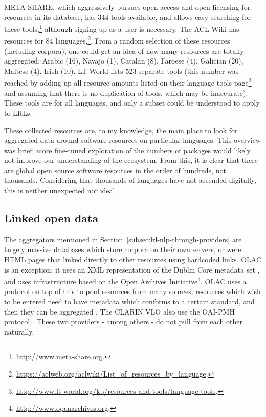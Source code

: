 META-SHARE, which aggressively pursues open access and open licensing for resources in its database, has 344 tools available, and allows easy searching for these tools,\footnote{\href{http://www.meta-share.org/}{http://www.meta-share.org}. } although signing up as a user is necessary. The ACL Wiki has resources for 84 languages,\footnote{\href{https://aclweb.org/aclwiki/List_of_resources_by_language}{https://aclweb.org/aclwiki/List\_of\_resources\_by\_language}. }. From a random selection of these resources (including corpora), one could get an idea of how many resources are totally aggregated: Arabic (16), Navajo (1), Catalan (8), Faroese (4), Galician (20), Maltese (4), Irish (10). LT-World lists 523 separate tools (this number was reached by adding up all resource amounts listed on their language tools page\footnote{\href{http://www.lt-world.org/kb/resources-and-tools/language-tools/}{http://www.lt-world.org/kb/resources-and-tools/language-tools}. } and assuming that there is no duplication of tools, which may be inaccurate). These tools are for all languages, and only a subset could be understood to apply to LRLs.

These collected resources are, to my knowledge, the main place to look for aggregated data around software resources on particular languages. This overview was brief; more fine-tuned exploration of the numbers of packages would likely not improve our understanding of the ecosystem. From this, it is clear that there are global open source software resources in the order of hundreds, not thousands. Considering that thousands of languages have not ascended digitally, this is neither unexpected nor ideal.

\subsection{Linked open data}
\label{subsec:lod}

The aggregators mentioned in Section~\ref{subsec:lrl-nlp-through-providers} are largely massive databases which store corpora on their own servers, or were HTML pages that linked directly to other resources using hardcoded links. OLAC is an exception; it uses an XML representation of the Dublin Core metadata set \citep{dublin1998dublin}, and uses infrastructure based on the Open Archives Initiative\footnote{\href{http://www.openarchives.org}{http://www.openarchives.org}. }. OLAC uses a protocol on top of this to pool resources from many sources; resources which wish to be entered need to have metadata which conforms to a certain standard, and then they can be aggregated \citep{simons2001olac}. The CLARIN VLO \citep{mccrae2015one} also use the OAI-PMH protocol \citep{sompel2004resource, mccrae2015reconciling}. These two providers - among others - do not pull from each other naturally.

